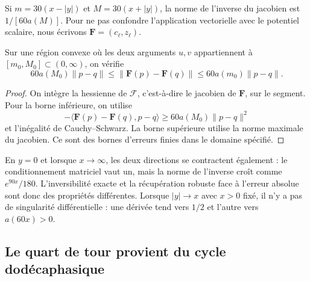 Si \(m=30(x-|y|)\) et \(M=30(x+|y|)\), la norme de l’inverse du
jacobien est \(1/[60a(M)]\). Pour ne pas confondre l’application vectorielle avec
le potentiel scalaire, nous écrivons
\(\mathbf F=(c_\ell,z_\ell)\).

\begin{proposition}
\label{md:comp:prop-sensibilidad}
Sur une région convexe où les deux arguments \(u,v\) appartiennent
à \([m_0,M_0]\subset(0,\infty)\), on vérifie
\begin{equation}
 60a(M_0)\|p-q\|
 \leq\|\mathbf F(p)-\mathbf F(q)\|
 \leq60a(m_0)\|p-q\|.
 \label{md:comp:cotas-finitas}
\end{equation}
\end{proposition}
\begin{proof}
On intègre la hessienne de \(\mathscr F\), c’est-à-dire le jacobien
de \(\mathbf F\), sur le segment. Pour la borne inférieure, on utilise
\[
 -\langle\mathbf F(p)-\mathbf F(q),p-q\rangle
 \geq60a(M_0)\|p-q\|^2
\]
et l’inégalité de Cauchy--Schwarz. La borne supérieure utilise la
norme maximale du jacobien. Ce sont des bornes d’erreurs finies dans le
domaine spécifié.
\end{proof}

En \(y=0\) et lorsque \(x\longrightarrow\infty\), les deux directions
se contractent également : le conditionnement matriciel vaut un,
mais la norme de l’inverse croît comme \(e^{90x}/180\).
L’inversibilité exacte et la récupération robuste face à l’erreur absolue
sont donc des propriétés différentes. Lorsque \(|y|\longrightarrow x\)
avec \(x>0\) fixé, il n’y a pas de singularité différentielle : une dérivée tend
vers \(1/2\) et l’autre vers \(a(60x)>0\).

\subsection{Le quart de tour provient du cycle dodécaphasique}
\label{md:comp:cuarto-giro}

